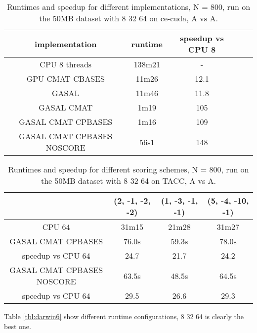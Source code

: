 \documentclass[../thesis.tex]{subfiles}
\begin{document}
\begin{table}
\centering
\caption{Runtimes and speedup for different implementations, N = 800, run on the 50MB dataset with 8 32 64 on ce-cuda, A vs A.}
\label{tbl:darwin3}
\begin{tabular}{c c c c c}
implementation & runtime & speedup vs CPU 8 \\ \hline
CPU 8 threads & 138m21 & - \\
GPU CMAT CBASES & 11m26 & 12.1 \\
GASAL & 11m46 & 11.8 \\
GASAL CMAT & 1m19 & 105 \\
GASAL CMAT CPBASES & 1m16 & 109 \\
GASAL CMAT CPBASES NOSCORE & 56s1 & 148 \\
\end{tabular}
\end{table}


\begin{table}
\centering
\caption{Runtimes and speedup for different scoring schemes, N = 800, run on the 50MB dataset with 8 32 64 on TACC, A vs A.}
\label{tbl:darwin8}
\begin{tabular}{c||c|c|c}
& (2, -1, -2, -2) & (1, -3, -1, -1) & (5, -4, -10, -1) \\ \hline
CPU 64 & 31m15 & 21m28 & 31m27 \\ \hline
GASAL CMAT CPBASES & 76.0s & 59.3s & 78.0s \\
speedup vs CPU 64 & 24.7 & 21.7 & 24.2 \\ \hline
GASAL CMAT CPBASES NOSCORE & 63.5s & 48.5s & 64.5s \\
speedup vs CPU 64 & 29.5 & 26.6 & 29.3 \\
\end{tabular}
\end{table}








Table \ref{tbl:darwin6} show different runtime configurations, 8 32 64 is clearly the best one.
\end{document}
